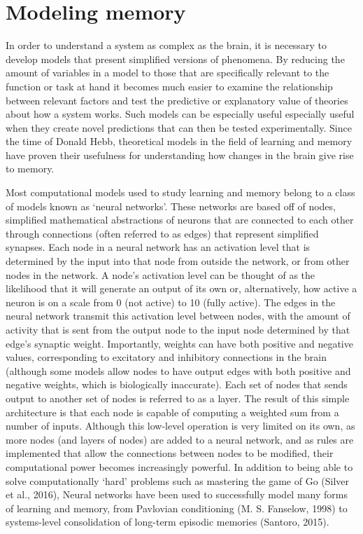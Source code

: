 \documentclass[12pt,a4paperpaper,]{report}
\begin{document}
\section{Modeling memory}\label{modeling-memory}

In order to understand a system as complex as the brain, it is necessary
to develop models that present simplified versions of phenomena. By
reducing the amount of variables in a model to those that are
specifically relevant to the function or task at hand it becomes much
easier to examine the relationship between relevant factors and test the
predictive or explanatory value of theories about how a system works.
Such models can be especially useful especially useful when they create
novel predictions that can then be tested experimentally. Since the time
of Donald Hebb, theoretical models in the field of learning and memory
have proven their usefulness for understanding how changes in the brain
give rise to memory.

Most computational models used to study learning and memory belong to a
class of models known as `neural networks'. These networks are based off
of nodes, simplified mathematical abstractions of neurons that are
connected to each other through connections (often referred to as edges)
that represent simplified synapses. Each node in a neural network has an
activation level that is determined by the input into that node from
outside the network, or from other nodes in the network. A node's
activation level can be thought of as the likelihood that it will
generate an output of its own or, alternatively, how active a neuron is
on a scale from 0 (not active) to 10 (fully active). The edges in the
neural network transmit this activation level between nodes, with the
amount of activity that is sent from the output node to the input node
determined by that edge's synaptic weight. Importantly, weights can have
both positive and negative values, corresponding to excitatory and
inhibitory connections in the brain (although some models allow nodes to
have output edges with both positive and negative weights, which is
biologically inaccurate). Each set of nodes that sends output to another
set of nodes is referred to as a layer. The result of this simple
architecture is that each node is capable of computing a weighted sum
from a number of inputs. Although this low-level operation is very
limited on its own, as more nodes (and layers of nodes) are added to a
neural network, and as rules are implemented that allow the connections
between nodes to be modified, their computational power becomes
increasingly powerful. In addition to being able to solve
computationally `hard' problems such as mastering the game of Go (Silver
et al., 2016), Neural networks have been used to successfully model many
forms of learning and memory, from Pavlovian conditioning (M. S.
Fanselow, 1998) to systems-level consolidation of long-term episodic
memories (Santoro, 2015).
\end{document}
